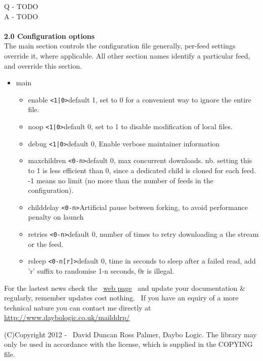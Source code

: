 \documentclass{article}
\begin{document}
\par Q - TODO
\\
A - TODO
\\
\\
\textbf{2.0 Configuration options}
\\
The main section controls the configuration file generally, per-feed settings override it,
where applicable.  All other section names identify a particular feed, and override this section.
\begin{itemize} %
\item main %
\begin{itemize}
\item enable \verb=<1|0>=\newline default 1, set to 0 for a convenient way to ignore the entire file.
\\
\item noop \verb=<1|0>=\newline default 0, set to 1 to disable modification of local files.
\\
\item debug \verb=<1|0>=\newline default 0, Enable verbose maintainer information
\\
\item maxchildren \verb=<0-n>=\newline default 0, max concurrent downloads. nb. setting this to 1
is less efficient than 0, since a dedicated child is cloned for each feed.
-1 means no limit (no more than the number of feeds in the configuration).
\\
\item childdelay \verb=<0-n>=\newline Artificial pause between forking, to avoid performance penalty on launch
\\
\item retries \verb=<0-n>=\newline default 0, number of times to retry downloading a the stream or the feed.
\\
\item rsleep \verb=<0-n[r]>=\newline default 0, time in seconds to sleep after a failed read, add 'r' suffix
to randomise 1-n seconds, 0r is illegal.
\end{itemize} %
\end{itemize} %

\par For the lastest news check the~ \href{http://bitbucket.org/daybologic/dlpodget}{web
page}~ and update your documentation \& regularly,
remember
updates cost nothing.~ If you have an equiry of a more technical
nature
you can contact me directly at \href{http://www.daybologic.co.uk/mailddrp/}{\url{http://www.daybologic.co.uk/mailddrp/}}\href{mailto:palmer@overchat.org}{}


\par (C)Copyright 2012 -
\the\year
~David Duncan Ross Palmer, Daybo Logic. The library may only be used in accordance
with
the license, which is supplied in the COPYING file.\\
\end{document}
